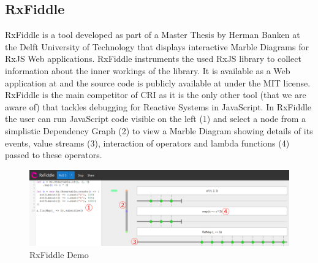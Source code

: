 	\subsection{RxFiddle}
	\label{sec:RxFiddle} %
	RxFiddle \cite{RxFiddle} is a tool developed as part of a Master Thesis by Herman Banken at the Delft University of Technology that displays interactive Marble Diagrams for RxJS Web applications. RxFiddle instruments the used RxJS library to collect information about the inner workings of the library. It is available as a Web application at \cite{RxFiddle} and the source code is publicly available at \cite{RxFiddleGitHub} under the MIT license. RxFiddle is the main competitor of CRI as it is the only other tool (that we are aware of) that tackles debugging for Reactive Systems in JavaScript. In RxFiddle the user can run JavaScript code visible on the left (1) and select a node from a simplistic Dependency Graph (2) to view a Marble Diagram showing details of its events, value streams (3), interaction of operators and lambda functions (4) passed to these operators.
	
	\begin{figure}[!h]
		\centering
		\includegraphics[scale=0.5,trim=0 0 0 0]{gfx/RxFiddleDemo.png}
		\caption{RxFiddle Demo \protect\cite{RxFiddle}}
		\label{fig:RxFiddleDemo}
	\end{figure}

